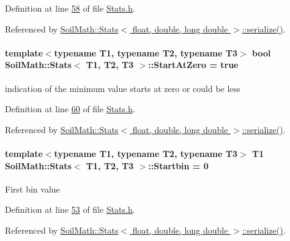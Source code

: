 Definition at line \hyperlink{_stats_8h_source_l00058}{58} of file \hyperlink{_stats_8h_source}{Stats.\+h}.



Referenced by \hyperlink{_stats_8h_source_l00651}{Soil\+Math\+::\+Stats$<$ float, double, long double $>$\+::serialize()}.

\hypertarget{class_soil_math_1_1_stats_a06f5e8404c2a0fa303dbb18a58d6deb5}{}
\paragraph[{Start\+At\+Zero}]{\setlength{\rightskip}{0pt plus 5cm}template$<$typename T1, typename T2, typename T3$>$ bool {\bf Soil\+Math\+::\+Stats}$<$ T1, T2, T3 $>$\+::Start\+At\+Zero = true}\label{class_soil_math_1_1_stats_a06f5e8404c2a0fa303dbb18a58d6deb5}
indication of the minimum value starts at zero or could be less 

Definition at line \hyperlink{_stats_8h_source_l00060}{60} of file \hyperlink{_stats_8h_source}{Stats.\+h}.



Referenced by \hyperlink{_stats_8h_source_l00651}{Soil\+Math\+::\+Stats$<$ float, double, long double $>$\+::serialize()}.

\hypertarget{class_soil_math_1_1_stats_acf54f4a105482109ebc884c8e56d0ba9}{}
\paragraph[{Startbin}]{\setlength{\rightskip}{0pt plus 5cm}template$<$typename T1, typename T2, typename T3$>$ T1 {\bf Soil\+Math\+::\+Stats}$<$ T1, T2, T3 $>$\+::Startbin = 0}\label{class_soil_math_1_1_stats_acf54f4a105482109ebc884c8e56d0ba9}
First bin value 

Definition at line \hyperlink{_stats_8h_source_l00053}{53} of file \hyperlink{_stats_8h_source}{Stats.\+h}.



Referenced by \hyperlink{_stats_8h_source_l00651}{Soil\+Math\+::\+Stats$<$ float, double, long double $>$\+::serialize()}.

\hypertarget{class_soil_math_1_1_stats_a6af590b7d033d882d5428c0d7a1f5e59}{}
